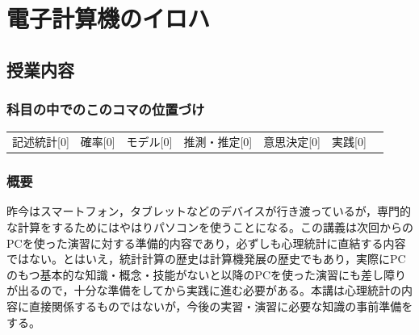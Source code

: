 \section{電子計算機のイロハ}
\label{lesson02}

\subsection{授業内容}
\subsubsection{科目の中でのこのコマの位置づけ}
\begin{tabular}[t]{ccccccc}
    記述統計[0] & 確率[0] & モデル[0] & 推測・推定[0] & 意思決定[0] & 実践[0]
\end{tabular}
\subsubsection{概要}
昨今はスマートフォン，タブレットなどのデバイスが行き渡っているが，専門的な計算をするためにはやはりパソコンを使うことになる。この講義は次回からのPCを使った演習に対する準備的内容であり，必ずしも心理統計に直結する内容ではない。とはいえ，統計計算の歴史は計算機発展の歴史でもあり，実際にPCのもつ基本的な知識・概念・技能がないと以降のPCを使った演習にも差し障りが出るので，十分な準備をしてから実践に進む必要がある。本講は心理統計の内容に直接関係するものではないが，今後の実習・演習に必要な知識の事前準備をする。
